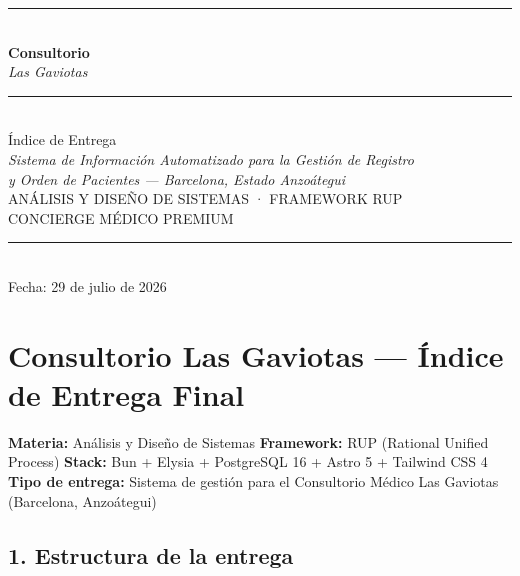\documentclass[11pt,letterpaper]{article}
\begin{document}
\begin{titlepage}
\thispagestyle{empty}
\centering
\vspace*{3cm}
\color{navy}\rule{0.7\textwidth}{1.2pt}\\[1.5em]
{\fontsize{36}{42}\selectfont\sffamily\bfseries\color{navy} Consultorio}\\[0.2em]
{\fontsize{42}{48}\selectfont\itshape\color{gold} Las Gaviotas}\\[1em]
\color{gold}\rule{0.7\textwidth}{1.2pt}\\[1.5em]
{\fontsize{22}{26}\selectfont\sffamily\color{navy-600} Índice de Entrega}\\[0.6em]
{\fontsize{14}{18}\selectfont\itshape\color{ink-2} Sistema de Información Automatizado para la Gestión de Registro}\\[0.2em]
{\fontsize{14}{18}\selectfont\itshape\color{ink-2} y Orden de Pacientes — Barcelona, Estado Anzoátegui}\\[2em]
{\fontsize{11}{14}\selectfont\sffamily\color{gold} \MakeUppercase{Análisis y Diseño de Sistemas · Framework RUP}}\\[0.3em]
{\fontsize{11}{14}\selectfont\sffamily\color{ink-2} \MakeUppercase{Concierge Médico Premium}}\\[3em]
\color{navy}\rule{0.5\textwidth}{0.6pt}\\[1em]
{\fontsize{12}{14}\selectfont\sffamily\color{ink-2} Fecha: 29 de julio de 2026}
\end{titlepage}
\thispagestyle{plain}
\renewcommand{\contentsname}{Índice}
\tableofcontents
\newpage
\section{Consultorio Las Gaviotas --- Índice de Entrega Final}

\textbf{Materia:} Análisis y Diseño de Sistemas
\textbf{Framework:} RUP (Rational Unified Process)
\textbf{Stack:} Bun + Elysia + PostgreSQL 16 + Astro 5 + Tailwind CSS 4
\textbf{Tipo de entrega:} Sistema de gestión para el Consultorio Médico Las Gaviotas (Barcelona, Anzoátegui)

\hrulefill

\subsection{1. Estructura de la entrega}
\end{document}
